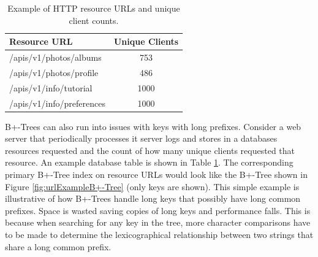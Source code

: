  

\begin{table}[h]
\centering
\label{tab:exampleResourceURLTable}
\begin{tabular}{|l|c|}
\hline
Resource URL                & \multicolumn{1}{l|}{Unique Clients} \\ \hline \hline
/apis/v1/photos/albums      & 753                        \\ \hline
/apis/v1/photos/profile     & 486                        \\ \hline
/apis/v1/info/tutorial      & 1000                       \\ \hline
/apis/v1/info/preferences   & 1000                       \\ \hline
\end{tabular}
\caption{Example of HTTP resource URLs and unique client counts.}
\end{table}

B+-Trees can also run into issues with keys with long prefixes. Consider a web server that periodically processes it server logs and stores in a databases resources requested and the count of how many unique clients requested that resource. An example database table is shown in Table \ref{tab:exampleResourceURLTable}. The corresponding primary B+-Tree index on resource URLs would look like the B+-Tree shown in Figure \ref{fig:urlExampleB+-Tree} (only keys are shown). This simple example is illustrative of how B+-Trees handle long keys that possibly have long common prefixes. Space is wasted saving copies of long keys and performance falls. This is because when searching for any key in the tree, more character comparisons have to be made to determine the lexicographical relationship between two strings that share a long common prefix. 

